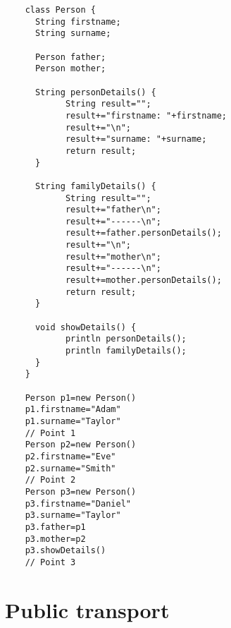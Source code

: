 \documentclass{article}
\begin{document}
\begin{verbatim}
    class Person {
      String firstname;
      String surname;
      
      Person father;
      Person mother;
    
      String personDetails() {
            String result="";
            result+="firstname: "+firstname;
            result+="\n";
            result+="surname: "+surname;
            return result;
      }
      
      String familyDetails() {
            String result="";
            result+="father\n";
            result+="------\n";
            result+=father.personDetails();
            result+="\n";
            result+="mother\n";
            result+="------\n";
            result+=mother.personDetails();
            return result;
      }
      
      void showDetails() {
            println personDetails();
            println familyDetails();
      }
    }
    
    Person p1=new Person()
    p1.firstname="Adam"
    p1.surname="Taylor"
    // Point 1
    Person p2=new Person()
    p2.firstname="Eve"
    p2.surname="Smith"
    // Point 2
    Person p3=new Person()
    p3.firstname="Daniel"
    p3.surname="Taylor"
    p3.father=p1
    p3.mother=p2
    p3.showDetails()
    // Point 3
\end{verbatim}


\section{Public transport}
\label{sec:public-transport}
\end{document}
